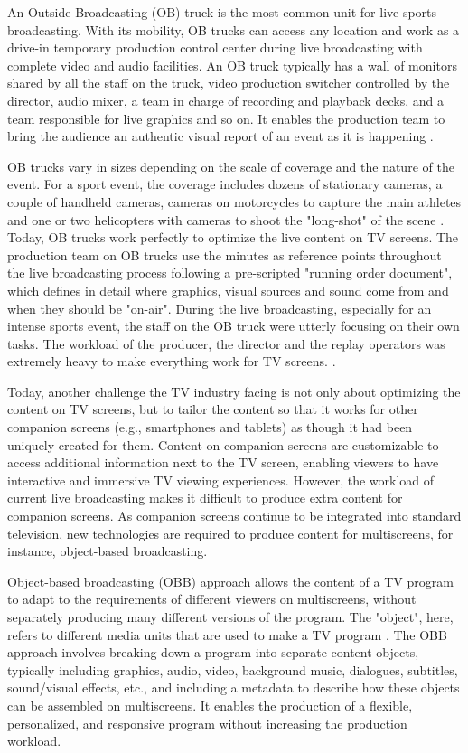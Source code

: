 \documentclass[sigchi-a, authorversion]{acmart}
\begin{document}
An Outside Broadcasting (OB) truck is the most common unit for live sports broadcasting. With its mobility, OB trucks can access any location and work as a drive-in temporary production control center during live broadcasting with complete video and audio facilities. An OB truck typically has a wall of monitors shared by all the staff on the truck, video production switcher controlled by the director, audio mixer, a team in charge of recording and playback decks, and a team responsible for live graphics and so on. It enables the production team to bring the audience an authentic visual report of an event as it is happening \cite{owens2012, owens2015}.

OB trucks vary in sizes depending on the scale of coverage and the nature of the event. For a sport event, the coverage includes dozens of stationary cameras, a couple of handheld cameras, cameras on motorcycles to capture the main athletes and one or two helicopters with cameras to shoot the "long-shot" of the scene \cite{owens2012, li2018}. Today, OB trucks work perfectly to optimize the live content on TV screens. The production team on OB trucks use the minutes as reference points throughout the live broadcasting process following a pre-scripted "running order document", which defines in detail where graphics, visual sources and sound come from and when they should be "on-air". During the live broadcasting, especially for an intense sports event, the staff on the OB truck were utterly focusing on their own tasks. The workload of the producer, the director and the replay operators was extremely heavy to make everything work for TV screens.
 \cite{li2018}. 
 
Today, another challenge the TV industry facing is not only about optimizing the content on TV screens, but to tailor the content so that it works for other companion screens (e.g., smartphones and tablets) as though it had been uniquely created for them. Content on companion screens are customizable to access additional information next to the TV screen, enabling viewers to have interactive and immersive TV viewing experiences\cite{bentley2017, dowell2015}. However, the workload of current live broadcasting makes it difficult to produce extra content for companion screens. As companion screens continue to be integrated into standard television, new technologies are required to produce content for multiscreens, for instance, object-based broadcasting\cite{li2018, armstrong2014}.

Object-based broadcasting (OBB) approach allows the content of a TV program to adapt to the requirements of different viewers on multiscreens, without separately producing many different versions of the program. The "object", here, refers to different media units that are used to make a TV program \cite{armstrong2014}. The OBB approach involves breaking down a program into separate content objects, typically including graphics, audio, video, background music, dialogues, subtitles, sound/visual effects, etc., and including a metadata to describe how these objects can be assembled on multiscreens. It enables the production of a flexible, personalized, and responsive program without increasing the production workload\cite{kegel2017, williams2016}.
\end{document}
